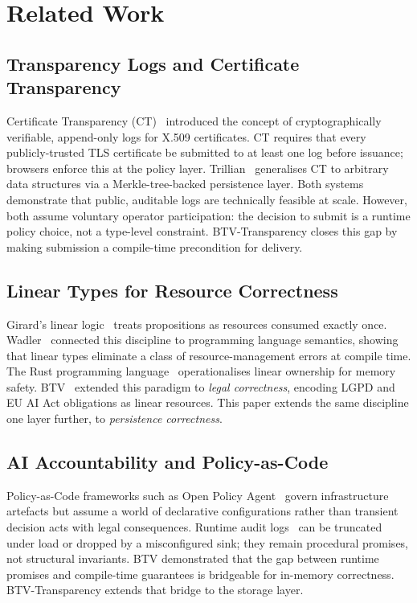 \section{Related Work}
\label{sec:related}

\subsection{Transparency Logs and Certificate Transparency}
Certificate Transparency (CT)~\cite{rfc6962} introduced the concept of
cryptographically verifiable, append-only logs for X.509 certificates. CT
requires that every publicly-trusted TLS certificate be submitted to at least
one log before issuance; browsers enforce this at the policy layer. Trillian~\cite{trillian}
generalises CT to arbitrary data structures via a Merkle-tree-backed
persistence layer. Both systems demonstrate that public, auditable logs are
technically feasible at scale. However, both assume voluntary operator
participation: the decision to submit is a runtime policy choice, not a
type-level constraint. BTV-Transparency closes this gap by making submission a
compile-time precondition for delivery.

\subsection{Linear Types for Resource Correctness}
Girard's linear logic~\cite{girard1987} treats propositions as resources
consumed exactly once. Wadler~\cite{wadler1990} connected this discipline to
programming language semantics, showing that linear types eliminate a class of
resource-management errors at compile time. The Rust programming
language~\cite{rust-book} operationalises linear ownership for memory safety.
BTV~\cite{btv2026} extended this paradigm to \emph{legal correctness},
encoding LGPD and EU AI Act obligations as linear resources. This paper extends
the same discipline one layer further, to \emph{persistence correctness}.

\subsection{AI Accountability and Policy-as-Code}
Policy-as-Code frameworks such as Open Policy Agent~\cite{opa} govern
infrastructure artefacts but assume a world of declarative configurations
rather than transient decision acts with legal consequences. Runtime audit
logs~\cite{nist-ai-rmf} can be truncated under load or dropped by a
misconfigured sink; they remain procedural promises, not structural invariants.
BTV demonstrated that the gap between runtime promises and compile-time
guarantees is bridgeable for in-memory correctness. BTV-Transparency extends
that bridge to the storage layer.

